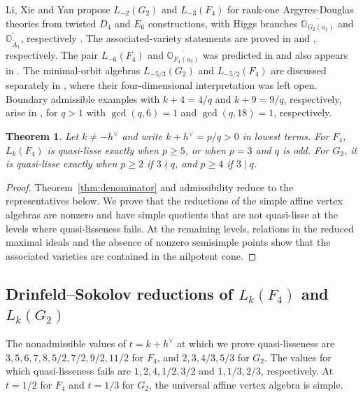 \documentclass[11pt,a4paper]{amsart}
\numberwithin{equation}{section}
\newtheorem{theorem}{Theorem}[section]
\theoremstyle{definition}
\theoremstyle{remark}
\newcommand{\OO}{\mathbb O}
\begin{document}
Li, Xie and Yan propose $L_{-2}(G_2)$ and $L_{-3}(F_4)$ for
rank-one Argyres-Douglas theories from twisted $D_4$ and $E_6$ constructions, with
Higgs branches $\overline{\OO_{G_2(a_1)}}$ and
$\overline{\OO_{\widetilde A_1}}$, respectively
\cite[Table~4 and Appendix~B.1]{LiXieYan2023}.
The associated-variety statements are proved in
\cite[Theorem~A]{ArakawaEtAl2025} and
\cite[Theorems~4.2 and~4.5]{ADS2026}, respectively.
The pair $L_{-6}(F_4)$ and $\overline{\OO_{F_4(a_3)}}$ was predicted
in \cite[Table~19]{XieYanLisse2021} and also appears in
\cite[Table~17]{LiXieYan2023}.
The minimal-orbit algebras $L_{-5/3}(G_2)$ and $L_{-5/2}(F_4)$
are discussed separately in \cite[Section~4]{BeemRastelli2018},
where their four-dimensional interpretation was left open.
Boundary admissible examples with $k+4=4/q$ and $k+9=9/q$, respectively, arise
in \cite[Section~5]{WangXie2019}, for $q>1$ with
$\gcd(q,6)=1$ and $\gcd(q,18)=1$, respectively.

\begin{theorem}\label{thm:FG-classification}
Let $k\ne-h^\vee$ and write $k+h^\vee=p/q>0$ in lowest terms.
For $F_4$, $L_k(F_4)$ is quasi-lisse exactly when $p\ge5$, or when
$p=3$ and $q$ is odd. For $G_2$, it is quasi-lisse exactly when
$p\ge2$ if $3\nmid q$, and $p\ge4$ if $3\mid q$.
\end{theorem}
\begin{proof}
Theorem~\ref{thm:denominator} and admissibility reduce to the representatives
below. We prove that the reductions of the simple affine vertex algebras
are nonzero and have simple quotients that are not quasi-lisse at the
levels where quasi-lisseness fails. At the remaining levels, relations
in the reduced maximal ideals and the absence of nonzero semisimple
points show that the associated varieties are contained in the nilpotent cone.
\end{proof}

\subsection{Drinfeld--Sokolov reductions of \texorpdfstring{$L_k(F_4)$ and $L_k(G_2)$}{Lk(F4) and Lk(G2)}}
The nonadmissible values of $t=k+h^\vee$ at which we prove quasi-lisseness
are $3,5,6,7,8,5/2,7/2,9/2,11/2$ for $F_4$,
and $2,3,4/3,5/3$ for $G_2$. The values for which quasi-lisseness
fails are $1,2,4,1/2,3/2$ and $1,1/3,2/3$, respectively.
At $t=1/2$ for $F_4$ and $t=1/3$ for $G_2$, the universal affine
vertex algebra is simple.
\end{document}
